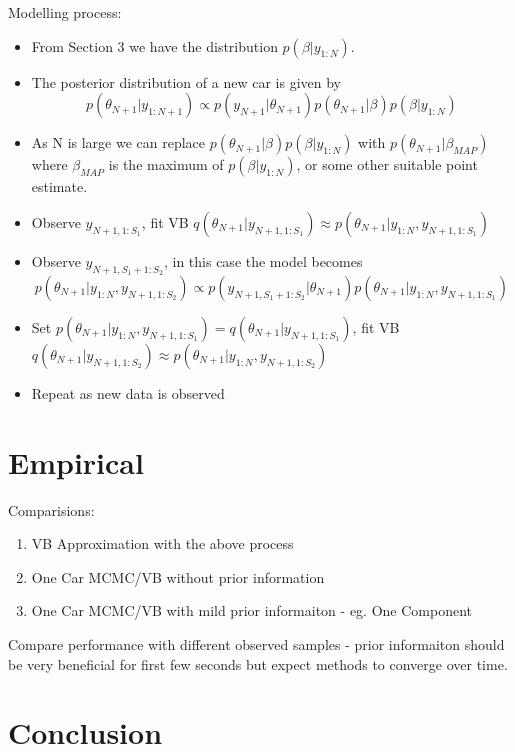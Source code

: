 \documentclass[12pt,a4paper]{article}\usepackage[]{graphicx}\usepackage[]{color}
\begin{document}
Modelling process:
\begin{itemize}
\item From Section 3 we have the distribution $p(\beta | y_{1:N})$.
\item The posterior distribution of a new car is given by
\begin{equation}
p(\theta_{N+1} | y_{1:N+1}) \propto p(y_{N+1} | \theta_{N+1}) p(\theta_{N+1} | \beta) p (\beta | y_{1:N})
\end{equation}
\item As N is large we can replace $ p(\theta_{N+1} | \beta) p (\beta | y_{1:N})$ with $ p(\theta_{N+1} | \beta_{MAP})$ where $\beta_{MAP}$ is the maximum of $ p (\beta | y_{1:N})$, or some other suitable point estimate.
\item Observe $y_{N+1, 1:S_1}$, fit VB $q(\theta_{N+1} | y_{N+1, 1:S_1}) \approx p(\theta_{N+1} | y_{1:N}, y_{N+1, 1:S_1})$
\item Observe $y_{N+1, S_1+1:S_2}$, in this case the model becomes
\begin{equation}
p(\theta_{N+1} | y_{1:N}, y_{N+1, 1:S_2}) \propto p(y_{N+1, S_1+1:S_2} | \theta_{N+1})p(\theta_{N+1} |  y_{1:N}, y_{N+1, 1:S_1})
\end{equation}
\item Set $p(\theta_{N+1} |  y_{1:N}, y_{N+1, 1:S_1}) = q(\theta_{N+1} | y_{N+1, 1:S_1})$, fit VB  $q(\theta_{N+1} | y_{N+1, 1:S_2}) \approx p(\theta_{N+1} | y_{1:N}, y_{N+1, 1:S_2})$
\item Repeat as new data is observed
\end{itemize}

\section{Empirical}

Comparisions:
\begin{enumerate}
\item VB Approximation with the above process
\item One Car MCMC/VB without prior information
\item One Car MCMC/VB with mild prior informaiton - eg. One Component
\end{enumerate}
Compare performance with different observed samples - prior informaiton should be very beneficial for first few seconds but expect methods to converge over time.

\section{Conclusion}
\end{document}
